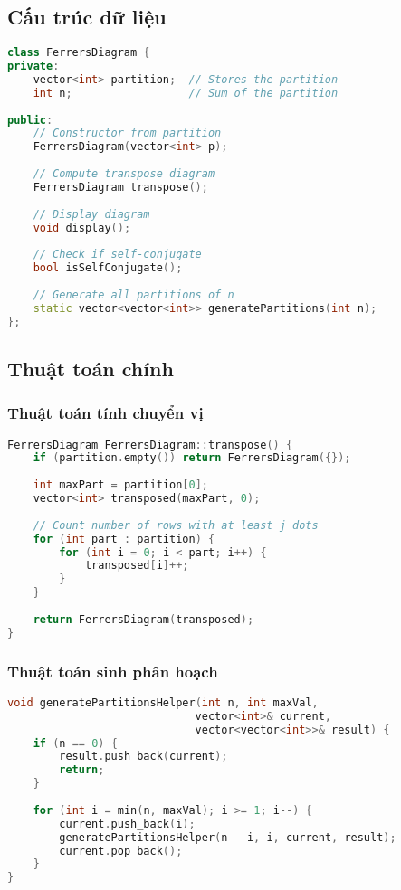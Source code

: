 \documentclass[12pt,a4paper]{article}
\theoremstyle{definition}
\begin{document}
\subsection{Cấu trúc dữ liệu}

\begin{lstlisting}[language=C++, caption=Class FerrersDiagram in C++]
class FerrersDiagram {
private:
    vector<int> partition;  // Stores the partition
    int n;                  // Sum of the partition
    
public:
    // Constructor from partition
    FerrersDiagram(vector<int> p);
    
    // Compute transpose diagram
    FerrersDiagram transpose();
    
    // Display diagram
    void display();
    
    // Check if self-conjugate
    bool isSelfConjugate();
    
    // Generate all partitions of n
    static vector<vector<int>> generatePartitions(int n);
};
\end{lstlisting}

\subsection{Thuật toán chính}

\subsubsection{Thuật toán tính chuyển vị}

\begin{lstlisting}[language=C++, caption=Algorithm to compute Ferrers transpose]
FerrersDiagram FerrersDiagram::transpose() {
    if (partition.empty()) return FerrersDiagram({});
    
    int maxPart = partition[0];
    vector<int> transposed(maxPart, 0);
    
    // Count number of rows with at least j dots
    for (int part : partition) {
        for (int i = 0; i < part; i++) {
            transposed[i]++;
        }
    }
    
    return FerrersDiagram(transposed);
}
\end{lstlisting}

\subsubsection{Thuật toán sinh phân hoạch}

\begin{lstlisting}[language=C++, caption=Generate all partitions of $n$]
void generatePartitionsHelper(int n, int maxVal, 
                             vector<int>& current, 
                             vector<vector<int>>& result) {
    if (n == 0) {
        result.push_back(current);
        return;
    }
    
    for (int i = min(n, maxVal); i >= 1; i--) {
        current.push_back(i);
        generatePartitionsHelper(n - i, i, current, result);
        current.pop_back();
    }
} 
\end{lstlisting}
\end{document}
